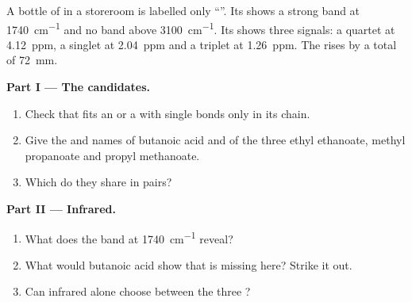 \begin{problem}
\label{pb:g12:proton-nmr:1}
A bottle of  in a storeroom is labelled only ``''. Its
 shows a strong band at \qty{1740}{cm^{-1}} and no band
above \qty{3100}{cm^{-1}}. Its  shows three signals: a
quartet at \qty{4.12}{ppm}, a singlet at \qty{2.04}{ppm} and a triplet at
\qty{1.26}{ppm}. The  rises by a total of \qty{72}{mm}.

\medskip
\noindent\textbf{Part I --- The candidates.}
\begin{enumerate}
  \item Check that  fits an  or a  with
        single bonds only in its chain.
  \item Give the  and names of butanoic acid and
        of the three  ethyl ethanoate, methyl propanoate and propyl
        methanoate.
  \item Which  do they share in pairs?
\end{enumerate}

\medskip
\noindent\textbf{Part II --- Infrared.}
\begin{enumerate}[resume]
  \item What does the band at \qty{1740}{cm^{-1}} reveal?
  \item What would butanoic acid show that is missing here? Strike it
        out.
  \item Can infrared alone choose between the three ?
\end{enumerate}


\end{problem}

